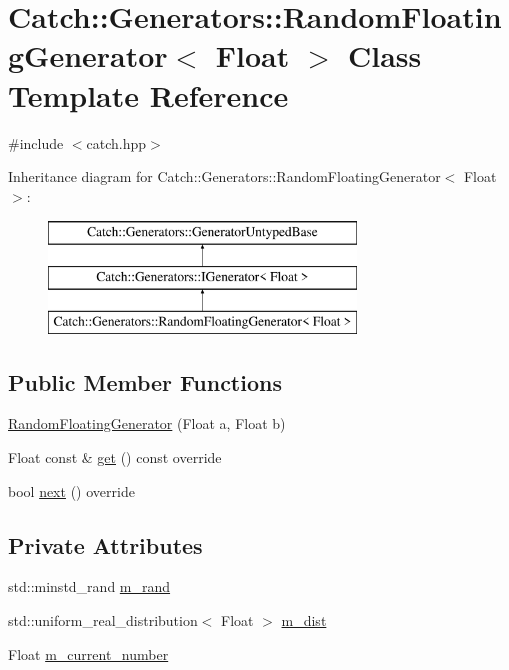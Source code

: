 \hypertarget{class_catch_1_1_generators_1_1_random_floating_generator}{}\section{Catch\+::Generators\+::Random\+Floating\+Generator$<$ Float $>$ Class Template Reference}
\label{class_catch_1_1_generators_1_1_random_floating_generator}


{\ttfamily \#include $<$catch.\+hpp$>$}

Inheritance diagram for Catch\+::Generators\+::Random\+Floating\+Generator$<$ Float $>$\+:\begin{figure}[H]
\begin{center}
\leavevmode
\includegraphics[height=3.000000cm]{class_catch_1_1_generators_1_1_random_floating_generator}
\end{center}
\end{figure}
\subsection*{Public Member Functions}
\begin{DoxyCompactItemize}
\item 
\mbox{\hyperlink{class_catch_1_1_generators_1_1_random_floating_generator_abce275ce88f7c3465addd7a98b6c408d}{Random\+Floating\+Generator}} (Float a, Float b)
\item 
Float const  \& \mbox{\hyperlink{class_catch_1_1_generators_1_1_random_floating_generator_a0dea6fa1f9e2647df022f0b588cf0a8f}{get}} () const override
\item 
bool \mbox{\hyperlink{class_catch_1_1_generators_1_1_random_floating_generator_a6a65e5f16abd884f58c31581b2a0d6db}{next}} () override
\end{DoxyCompactItemize}
\subsection*{Private Attributes}
\begin{DoxyCompactItemize}
\item 
std\+::minstd\+\_\+rand \mbox{\hyperlink{class_catch_1_1_generators_1_1_random_floating_generator_acbc83a5a9d8d0491b1f5b8b9a65a0a0b}{m\+\_\+rand}}
\item 
std\+::uniform\+\_\+real\+\_\+distribution$<$ Float $>$ \mbox{\hyperlink{class_catch_1_1_generators_1_1_random_floating_generator_a6a79be0000a6c2a17e4f11dadb43c8ac}{m\+\_\+dist}}
\item 
Float \mbox{\hyperlink{class_catch_1_1_generators_1_1_random_floating_generator_a3591690761d8da0f4438623a453e6bc0}{m\+\_\+current\+\_\+number}}
\end{DoxyCompactItemize}
